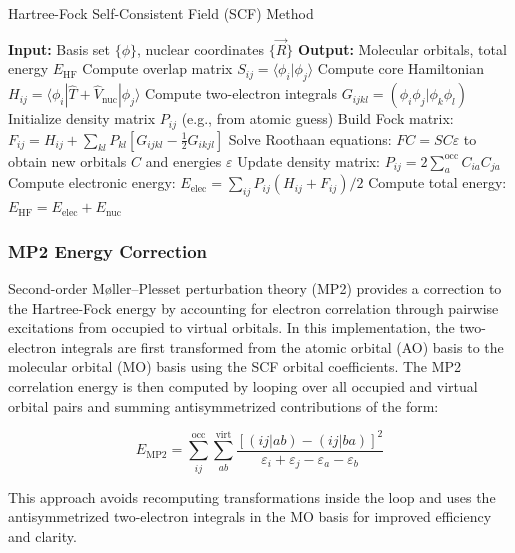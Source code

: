\documentclass[12pt]{article}
\begin{document}
\begin{algorithm}[H]
\caption{Hartree-Fock Self-Consistent Field (SCF) Method}
\begin{algorithmic}[1]
\Statex \textbf{Input:} Basis set $\{\phi\}$, nuclear coordinates $\{\vec{R}\}$
\Statex \textbf{Output:} Molecular orbitals, total energy $E_{\text{HF}}$
\State Compute overlap matrix $S_{ij} = \langle \phi_i | \phi_j \rangle$
\State Compute core Hamiltonian $H_{ij} = \langle \phi_i | \hat{T} + \hat{V}_{\text{nuc}} | \phi_j \rangle$
\State Compute two-electron integrals $G_{ijkl} = (\phi_i\phi_j|\phi_k\phi_l)$
\State Initialize density matrix $P_{ij}$ (e.g., from atomic guess)
\Repeat
    \State Build Fock matrix: $F_{ij} = H_{ij} + \sum_{kl} P_{kl} \left[ G_{ijkl} - \frac{1}{2} G_{ikjl} \right]$
    \State Solve Roothaan equations: $FC = SC\varepsilon$ to obtain new orbitals $C$ and energies $\varepsilon$
    \State Update density matrix: $P_{ij} = 2 \sum_{a}^{\text{occ}} C_{ia} C_{ja}$
    \State Compute electronic energy: $E_{\text{elec}} = \sum_{ij} P_{ij} (H_{ij} + F_{ij})/2$
\State Compute total energy: $E_{\text{HF}} = E_{\text{elec}} + E_{\text{nuc}}$
\end{algorithmic}
\end{algorithm}

\subsubsection*{MP2 Energy Correction}

Second-order Møller–Plesset perturbation theory (MP2) provides a correction to the Hartree-Fock energy by accounting for electron correlation through pairwise excitations from occupied to virtual orbitals. In this implementation, the two-electron integrals are first transformed from the atomic orbital (AO) basis to the molecular orbital (MO) basis using the SCF orbital coefficients. The MP2 correlation energy is then computed by looping over all occupied and virtual orbital pairs and summing antisymmetrized contributions of the form:

\[
E_{\text{MP2}} = \sum_{ij}^{\text{occ}} \sum_{ab}^{\text{virt}} 
\frac{\left[(ij|ab) - (ij|ba)\right]^2}{\varepsilon_i + \varepsilon_j - \varepsilon_a - \varepsilon_b}
\]

This approach avoids recomputing transformations inside the loop and uses the antisymmetrized two-electron integrals in the MO basis for improved efficiency and clarity.
\end{document}
